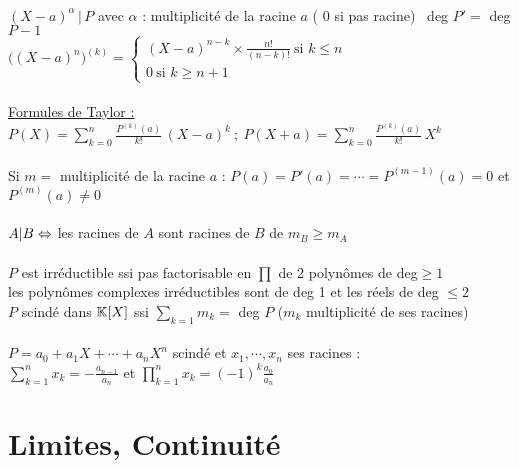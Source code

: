 \documentclass[12 pt]{exampleclass}
\begin{document}
\begin{flushleft}
\begin{doublespace}
	\text{ }\\
	$(X - a)^\alpha \, | \, P$ avec $\alpha$ : multiplicité de la racine $a$ ( 0 si pas racine) \ deg $P' = $ deg $P - 1$\\
	$\Big( (X - a)^n \Big)^{(k)} = \left\{\begin{array}{ll} (X - a)^{n - k} \times \frac{ n!}{(n - k)!} \ \text{si } k\leq n \\  0 \ \text{si } k\geq n+1 \end{array} \right.$\\
	
	\text{ }\\
	\underline{Formules de Taylor :}\\
	$P(X) = \sum_{k = 0}^n \frac{P^{(k)}(a)}{k!} \, (X - a)^k \ ; \ P(X + a ) = \sum_{ k = 0}^n \frac{P^{(k)}(a)}{k!} \, X^k$\\
	\text{ }\\
	Si $m =$ multiplicité de la racine $a$ : $P(a) =P'(a) = \cdots = P^{(m - 1)} (a) = 0$ et $P^{(m)} (a) \ne 0$\\
	\text{ }\\
	$A | B \Leftrightarrow$ les racines de $A$ sont racines de $B$ de $m_B \geq m_A$\\
	
	\text{ }\\
	$P$ est irréductible ssi pas factorisable en $\prod$ de 2 polynômes de deg$\geq 1$\\
	les polynômes complexes irréductibles sont de deg 1 et les réels de deg $\leq 2$\\
	$P$ scindé dans $\mathbb{K}[X]$ ssi $\sum_{ k =1} m_k = $ deg $P$ ($m_k$ multiplicité de ses racines)\\
	\text{ }\\
	$P = a_0 + a_1X + \cdots + a_n X^n$ scindé et $x_1, \cdots, x_n$ ses racines :\\
	$\sum_{k = 1}^n x_k = -\frac{a_{n -1}}{a_n}$ et $\prod_{ k =1}^n x_k = (- 1)^k \frac{a_0}{a_n}$\\
		
\end{doublespace}
\end{flushleft}

\section{Limites, Continuité}
\end{document}
